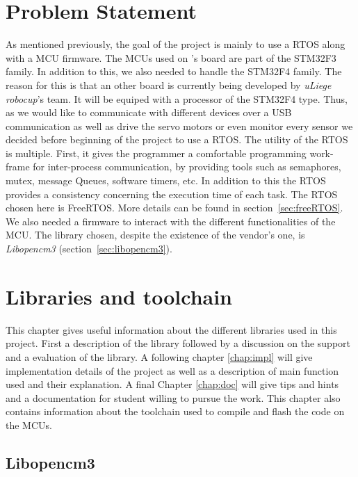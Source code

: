 \documentclass[12pt,a4paper]{report}
\begin{document}
\chapter{Problem Statement}
\label{ch:prob}
As mentioned previously, the goal of the project is mainly to use a RTOS along with a MCU firmware. The MCUs used on \cite{masterGL}'s board are part of the STM32F3 family. In addition to this, we also needed to handle the STM32F4 family. The reason for this is that an other board is currently being developed by \emph{uLiege robocup}'s team. It will be equiped with a processor of the STM32F4 type.\newline
Thus, as we would like to communicate with different devices over a USB communication as well as drive the servo motors or even monitor every sensor we decided before beginning of the project to use a RTOS.\newline
The utility of the RTOS is multiple. First, it gives the programmer a comfortable programming work-frame for inter-process communication, by providing tools such as semaphores, mutex, message Queues, software timers, etc. In addition to this the RTOS provides a consistency concerning the execution time of each task.\newline
The RTOS chosen here is FreeRTOS. More details can be found in section~\ref{sec:freeRTOS}. We also needed a firmware to interact with the different functionalities of the MCU. The library chosen, despite the existence of the vendor's one, is \emph{Libopencm3} (section~\ref{sec:libopencm3}). 
\chapter{Libraries and toolchain}

This chapter gives useful information about the different libraries used in this project. First a description of the library followed by a discussion on the support and a evaluation of the library. A following chapter \ref{chap:impl} will give implementation details of the project as well as a description of main function used and their explanation. A final Chapter \ref{chap:doc} will give tips and hints and a documentation for student willing to pursue the work. This chapter also contains information about the toolchain used to compile and flash the code on the MCUs.
\section{Libopencm3}
\end{document}
